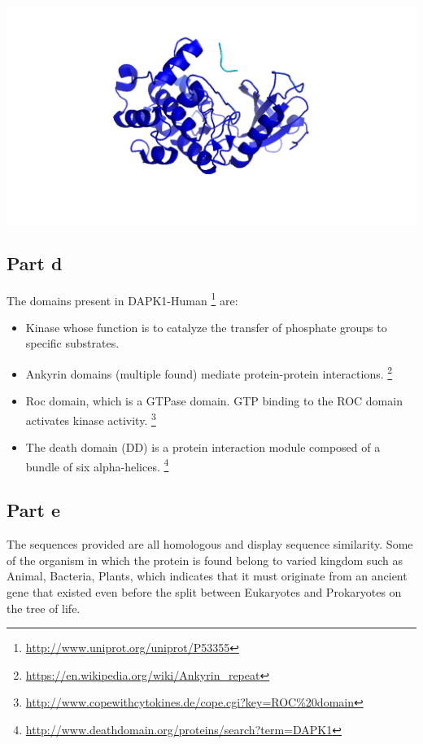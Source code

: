 \documentclass[11pt, a4paper,titlepage]{article}
\begin{document}
\includegraphics[width=15cm]{./Figures/5c.png}

\subsection*{Part d}

The domains present in DAPK1-Human
\footnote{\url{http://www.uniprot.org/uniprot/P53355}} are:

\begin{itemize}
\item Kinase whose function is to catalyze the transfer of phosphate
  groups to specific substrates.
\item Ankyrin domains (multiple found) mediate protein-protein
  interactions.
  \footnote{\url{https://en.wikipedia.org/wiki/Ankyrin_repeat}}
\item Roc domain, which is a GTPase domain. GTP binding to the ROC
  domain activates kinase activity.
  \footnote{\url{http://www.copewithcytokines.de/cope.cgi?key=ROC\%20domain}} 
\item The death domain (DD) is a protein interaction module composed
  of a bundle of six
  alpha-helices. \footnote{\url{http://www.deathdomain.org/proteins/search?term=DAPK1}}
\end{itemize}
\subsection*{Part e}

The sequences provided are all homologous and display sequence
similarity. Some of the organism in which the protein is found belong
to varied kingdom such as Animal, Bacteria, Plants, which indicates
that it must originate from an ancient gene that existed even before
the split between Eukaryotes and Prokaryotes on the tree of life.
\end{document}
